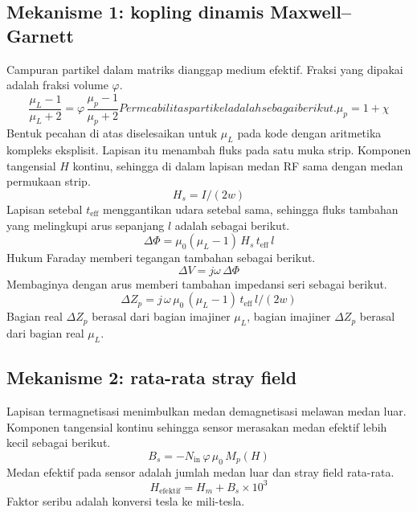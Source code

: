 \documentclass[a4paper,11pt]{article}
\begin{document}
\subsection{Mekanisme 1: kopling dinamis Maxwell--Garnett}
Campuran partikel dalam matriks dianggap medium efektif.
Fraksi yang dipakai adalah fraksi volume $\varphi$.
\begin{subequations}\label{eq:18}
\begin{equation}
\frac{\mu_{L}-1}{\mu_{L}+2}
=
\varphi\,\frac{\mu_{p}-1}{\mu_{p}+2}
\label{eq:18a}
\end{equation}
Permeabilitas partikel adalah sebagai berikut.
\begin{equation}
\mu_{p} = 1+\chi
\label{eq:18b}
\end{equation}
\end{subequations}
Bentuk pecahan di atas diselesaikan untuk $\mu_{L}$ pada kode
dengan aritmetika kompleks eksplisit.
Lapisan itu menambah fluks pada satu muka strip.
Komponen tangensial $H$ kontinu, sehingga di dalam lapisan medan RF sama dengan
medan permukaan strip.
\begin{equation*}
H_{s} = I/(2w)
\end{equation*}
Lapisan setebal $t_{\mathrm{eff}}$ menggantikan udara setebal sama, sehingga
fluks tambahan yang melingkupi arus sepanjang $l$ adalah sebagai berikut.
\begin{equation*}
\Delta\Phi = \mu_{0}(\mu_{L}-1)\,H_{s}\,t_{\mathrm{eff}}\,l
\end{equation*}
Hukum Faraday memberi tegangan tambahan sebagai berikut.
\begin{equation*}
\Delta V = j\omega\,\Delta\Phi
\end{equation*}
Membaginya dengan arus memberi tambahan impedansi seri sebagai berikut.
\begin{equation}
\Delta Z_{p} = j\,\omega\,\mu_{0}\,(\mu_{L}-1)\,t_{\mathrm{eff}}\,l/(2w)
\label{eq:19}
\end{equation}
Bagian real $\Delta Z_{p}$ berasal dari bagian imajiner $\mu_{L}$,
bagian imajiner $\Delta Z_{p}$ berasal dari bagian real $\mu_{L}$.

\subsection{Mekanisme 2: rata-rata stray field}
Lapisan termagnetisasi menimbulkan medan demagnetisasi melawan medan luar.
Komponen tangensial kontinu sehingga sensor merasakan medan efektif
lebih kecil sebagai berikut.
\begin{equation}
B_{s} = -N_{\mathrm{in}}\,\varphi\,\mu_{0}\,M_{p}(H)
\label{eq:20}
\end{equation}
Medan efektif pada sensor adalah jumlah medan luar dan stray field rata-rata.
\begin{equation*}
H_{\mathrm{efektif}} = H_{m}+B_{s}\times 10^{3}
\end{equation*}
Faktor seribu adalah konversi tesla ke mili-tesla.
\end{document}
